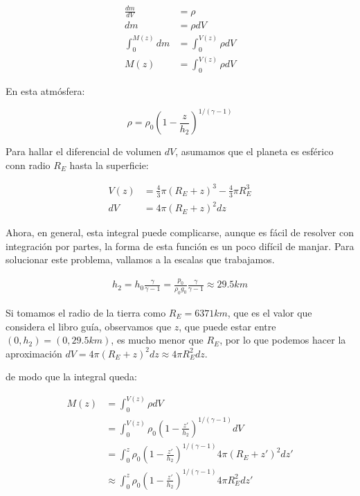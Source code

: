 \begin{align*}
    \frac{dm}{dV} &= \rho \\
    dm &= \rho dV \\
    \int_{0}^{M(z)} dm&= \int_{0}^{V(z)} \rho dV\\
    M(z) &= \int_{0}^{V(z)} \rho dV
\end{align*}

En esta atmósfera:

\begin{equation}
    \rho = \rho_0 \left( 1- \frac{z}{h_2} \right)^{1/(\gamma - 1)}
    \label{eq:rho}
\end{equation}

Para hallar el diferencial de volumen $dV$, asumamos que el planeta es esférico conn radio $R_E$ hasta la superficie:

\begin{align*}
    V(z) &= \frac{4}{3} \pi (R_E + z)^3 -\frac{4}{3} \pi R_E^3 \\
    dV &= 4 \pi (R_E + z)^2 dz
\end{align*}

Ahora, en general, esta integral puede complicarse, aunque es fácil de resolver con integración por partes, la forma de esta función es un poco difícil de manjar. Para solucionar este problema, vallamos a la escalas que trabajamos.

\begin{align*}
    h_2 = h_0 \frac{\gamma}{\gamma - 1} = \frac{p_0}{\rho_0 g_0} \frac{\gamma}{\gamma - 1} \approx 29.5 km
\end{align*}

Si tomamos el radio de la tierra como $R_E = 6371 km$, que es el valor que considera el libro guía, observamos que $z$, que puede estar entre $(0, h_2) = (0, 29.5 km)$, es mucho menor que $R_E$, por lo que podemos hacer la aproximación $dV = 4 \pi (R_E + z)^2 dz \approx 4 \pi R_E^2 dz$.

de modo que la integral queda:

\begin{align*}
    M(z) &= \int_{0}^{V(z)} \rho dV \\
    &= \int_{0}^{V(z)} \rho_0 \left( 1- \frac{z'}{h_2} \right)^{1/(\gamma - 1)} dV \\
    &= \int_{0}^{z} \rho_0 \left( 1- \frac{z'}{h_2} \right)^{1/(\gamma - 1)}  4 \pi (R_E + z')^2 dz'  \\
    &\approx \int_{0}^{z} \rho_0 \left( 1- \frac{z'}{h_2} \right)^{1/(\gamma - 1)}  4 \pi R_E^2 dz'  \\
\end{align*}

